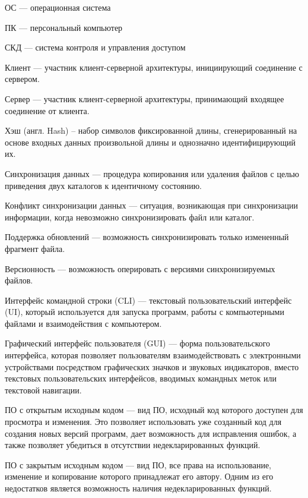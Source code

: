 ОС --- операционная система

ПК --- персональный компьютер

СКД --- система контроля и управления доступом

Клиент --- участник клиент-серверной архитектуры, инициирующий 
соединение с сервером.

Сервер --- участник клиент-серверной архитектуры, принимающий входящее соединение от клиента.

Хэш (англ. Hash) – набор символов фиксированной длины, сгенерированный на основе входных данных произвольной длины и однозначно идентифицирующий их.

Синхронизация данных --- процедура копирования или удаления файлов с целью приведения двух каталогов к идентичному состоянию.

Конфликт синхронизации данных --- ситуация, возникающая при синхронизации информации, когда невозможно синхронизировать файл или каталог.

Поддержка обновлений --- возможность синхронизировать только измененный фрагмент файла.

Версионность --- возможность оперировать с версиями синхронизируемых файлов.

Интерфейс командной строки (CLI) --- текстовый пользовательский интерфейс (UI), который используется для запуска программ, работы с компьютерными файлами и взаимодействия с компьютером. 

Графический интерфейс пользователя (GUI) --- форма пользовательского интерфейса, которая позволяет пользователям взаимодействовать с электронными устройствами посредством графических значков и звуковых индикаторов, вместо текстовых пользовательских интерфейсов, вводимых командных меток или текстовой навигации.

ПО с открытым исходным кодом --- вид ПО, исходный код которого доступен для просмотра и изменения. Это позволяет использовать уже созданный код для создания новых версий программ, дает возможность для исправления ошибок, а также позволяет убедиться в отсутствии недекларированных функций.

ПО с закрытым исходным кодом --- вид ПО, все права на использование, изменение и копирование которого принадлежат его автору. Одним из его недостатков является возможность наличия недекларированных функций.


